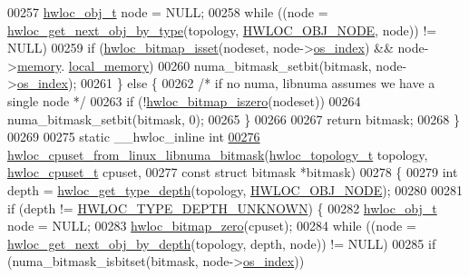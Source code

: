 \begin{DoxyCode}
00257     \hyperlink{a00016}{hwloc_obj_t} node = NULL;
00258     \textcolor{keywordflow}{while} ((node = \hyperlink{a00053_ga5f08ceb69375341e73563cfe2e77534e}{hwloc_get_next_obj_by_type}(topology, \hyperlink{a00041_ggacd37bb612667dc437d66bfb175a8dc55aaf0964881117bdedf1a5e9332cd120dd}{HWLOC_OBJ_NODE}, node)) !=
       NULL)
00259       \textcolor{keywordflow}{if} (\hyperlink{a00065_ga2583f44cbdb5fff2ea40efdcf3975d3f}{hwloc_bitmap_isset}(nodeset, node->\hyperlink{a00016_a61a7a80a68eaccbaaa28269e678c81a9}{os_index}) && node->\hyperlink{a00016_a1dc830816716213b5f797e4052487864}{memory}.
      \hyperlink{a00020_aace044c7f3fd9dffe50202296bf1dc5a}{local_memory})
00260         numa\_bitmask\_setbit(bitmask, node->\hyperlink{a00016_a61a7a80a68eaccbaaa28269e678c81a9}{os_index});
00261   \} \textcolor{keywordflow}{else} \{
00262     \textcolor{comment}{/* if no numa, libnuma assumes we have a single node */}
00263     \textcolor{keywordflow}{if} (!\hyperlink{a00065_gaa94fed35d2a598bc4a8657b6955b7bf5}{hwloc_bitmap_iszero}(nodeset))
00264       numa\_bitmask\_setbit(bitmask, 0);
00265   \}
00266 
00267   \textcolor{keywordflow}{return} bitmask;
00268 \}
00269 
00275 \textcolor{keyword}{static} \_\_hwloc\_inline \textcolor{keywordtype}{int}
\hypertarget{a00034_source_l00276}{}\hyperlink{a00069_ga47747968f12c2674d2840dfbacce4940}{00276} \hyperlink{a00069_ga47747968f12c2674d2840dfbacce4940}{hwloc_cpuset_from_linux_libnuma_bitmask}(\hyperlink{a00039_ga9d1e76ee15a7dee158b786c30b6a6e38}{hwloc_topology_t} topology, 
      \hyperlink{a00040_ga4bbf39b68b6f568fb92739e7c0ea7801}{hwloc_cpuset_t} cpuset,
00277                                         \textcolor{keyword}{const} \textcolor{keyword}{struct} bitmask *bitmask)
00278 \{
00279   \textcolor{keywordtype}{int} depth = \hyperlink{a00046_gaea7c64dd59467f5201ba87712710b14d}{hwloc_get_type_depth}(topology, \hyperlink{a00041_ggacd37bb612667dc437d66bfb175a8dc55aaf0964881117bdedf1a5e9332cd120dd}{HWLOC_OBJ_NODE});
00280 
00281   \textcolor{keywordflow}{if} (depth != \hyperlink{a00046_ggaf4e663cf42bbe20756b849c6293ef575a0565ab92ab72cb0cec91e23003294aad}{HWLOC_TYPE_DEPTH_UNKNOWN}) \{
00282     \hyperlink{a00016}{hwloc_obj_t} node = NULL;
00283     \hyperlink{a00065_ga6c540b9fe63b8223b6aba46d56dd63b8}{hwloc_bitmap_zero}(cpuset);
00284     \textcolor{keywordflow}{while} ((node = \hyperlink{a00053_gab7c1dce3f42ece5bfa621e87cf332418}{hwloc_get_next_obj_by_depth}(topology, depth, node)) != NULL)
00285       \textcolor{keywordflow}{if} (numa\_bitmask\_isbitset(bitmask, node->\hyperlink{a00016_a61a7a80a68eaccbaaa28269e678c81a9}{os_index}))

\end{DoxyCode}
